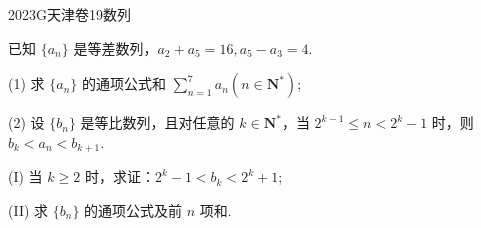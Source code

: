 
\begin{problem}{2023}{G}{天津卷}{19}{数列}

已知 $\{a_n\}$ 是等差数列，$a_2+a_5=16, a_5-a_3=4$.

(1) 求 $\{a_n\}$ 的通项公式和 $\sum\limits_{n=1}^7 a_n(n \in \mathbf{N}^*)$;

(2) 设 $\{b_n\}$ 是等比数列，且对任意的 $k \in \mathbf{N}^*$，当 $2^{k-1} \leqslant n < 2^k-1$ 时，则 $b_k < a_n < b_{k+1}$.

(I) 当 $k \geqslant 2$ 时，求证：$2^k-1 < b_k < 2^k+1$;

(II) 求 $\{b_n\}$ 的通项公式及前 $n$ 项和.

\end{problem}